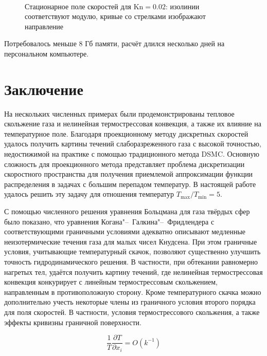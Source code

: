 \documentclass[
aps,%
12pt,%
final,%
notitlepage,%
oneside,%
onecolumn,%
nobibnotes,%
nofootinbib,%
superscriptaddress,%
noshowpacs,%
showkeys,%
tightenlines,%
centertags]%
{revtex4}
\newcommand{\Kn}{\mathrm{Kn}}
\newcommand{\pder}[2][]{\frac{\partial#1}{\partial#2}}
\newcommand{\OO}[1]{O(#1)}
\begin{document}

\begin{figure}
    \centering
    \\
\end{figure}
\begin{figure}
    \ContinuedFloat %
    \caption{Стационарное поле скоростей для \(\Kn=0.02\):
        изолинии соответствуют модулю, кривые со стрелками изображают направление}
    \label{fig:elliptic:flow}
\end{figure}

Потребовалось меньше 8 Гб памяти, расчёт длился несколько дней на персональном компьютере.

\section{Заключение}

На нескольких численных примерах были продемонстрированы тепловое скольжение газа
и нелинейная термострессовая конвекция, а также их влияние на температурное поле.
Благодаря проекционному методу дискретных скоростей удалось получить картины течений
слаборазреженного газа с высокой точностью, недостижимой на практике с помощью традиционного метода DSMC.
Основную сложность для проекционного метода представляет проблема дискретизации скоростного пространства
для получения приемлемой аппроксимации функции распределения в задачах с большим перепадом температур.
В настоящей работе удалось решить эту задачу для отношения температур \(T_{\max}/T_{\min}=5\).

С помощью численного решения уравнения Больцмана для газа твёрдых сфер было показано,
что уравнения Когана"--~Галкина"--~Фридлендера с соответствующими граничными условиями адекватно описывают
медленные неизотермические течения газа для малых чисел Кнудсена.
При этом граничные условия, учитывающие температурный скачок, позволяют
существенно улучшить точность гидродинамического решения.
В частности, при обтекании равномерно нагретых тел, удаётся получить картину течений,
где нелинейная термострессовая конвекция конкурирует с линейным термострессовым скольжением,
направленным в противоположную сторону.
Кроме температурного скачка можно дополнительно учесть некоторые члены из граничного условия
второго порядка для поля скоростей. В частности, условия термострессового скольжения,
а также эффекты кривизны граничной поверхности.

\begin{equation}
    \frac1T\pder[T]{x_i} = \OO{k^{-1}}
\end{equation}



\end{document}
